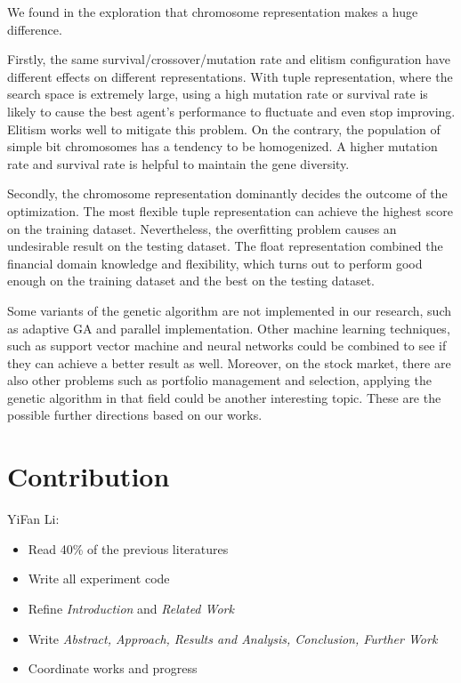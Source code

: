 \documentclass{article}
\begin{document}
We found in the exploration that chromosome representation makes a huge difference.

Firstly, the same survival/crossover/mutation rate and elitism configuration have
different effects on different representations.
With tuple representation, where the search space is extremely large,
using a high mutation rate or survival rate is likely to cause the best agent's performance to fluctuate
and even stop improving.
Elitism works well to mitigate this problem.
On the contrary, the population of simple bit chromosomes has a tendency to be homogenized.
A higher mutation rate and survival rate is helpful to maintain the gene diversity.

Secondly, the chromosome representation dominantly decides the outcome of the optimization.
The most flexible tuple representation can achieve the highest score on the training dataset.
Nevertheless, the overfitting problem causes an undesirable result on the testing dataset.
The float representation combined the financial domain knowledge and flexibility,
which turns out to perform good enough on the training dataset and the best on the testing dataset.

Some variants of the genetic algorithm are not implemented in our research,
such as adaptive GA and parallel implementation.
Other machine learning techniques, such as support vector machine and neural networks
could be combined to see if they can achieve a better result as well.
Moreover, on the stock market, there are also other problems such as portfolio management and selection,
applying the genetic algorithm in that field could be another interesting topic.
These are the possible further directions based on our works.


\section{Contribution}

YiFan Li:

\begin{itemize}
    \item Read 40\% of the previous literatures
    \item Write all experiment code
    \item Refine \textit{Introduction} and \textit{Related Work}
    \item Write \textit{Abstract, Approach, Results and Analysis, Conclusion, Further Work}
    \item Coordinate works and progress
\end{itemize}
\end{document}
